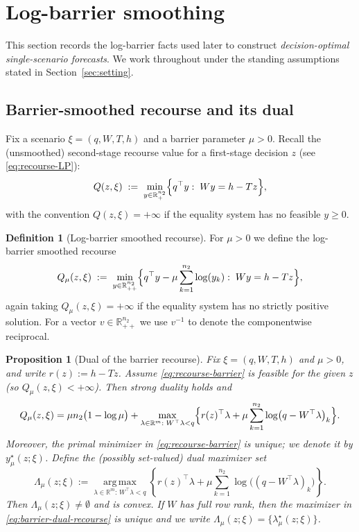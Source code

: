 \documentclass[11pt]{article}
\theoremstyle{plain}
\newtheorem{proposition}[theorem]{Proposition}
\theoremstyle{definition}
\newtheorem{definition}[theorem]{Definition}
\theoremstyle{remark}
\newcommand{\argmax}{\operatorname*{arg\,max}}
\begin{document}
\section{Log-barrier smoothing}\label{sec:barrier}

This section records the log-barrier facts used later to construct \emph{decision-optimal single-scenario
forecasts}. We work throughout under the standing assumptions stated in Section~\ref{sec:setting}.

\subsection{Barrier-smoothed recourse and its dual}\label{subsec:barrier:recourse}

Fix a scenario $\xi=(q,W,T,h)$ and a barrier parameter $\mu>0$. Recall the (unsmoothed) second-stage
recourse value for a first-stage decision $z$ (see \eqref{eq:recourse-LP}):
\[
Q(z,\xi)\;:=\;\min_{y\in\mathbb{R}^{n_2}_+}\Bigl\{q^\top y:\;Wy=h-Tz\Bigr\},
\]
with the convention $Q(z,\xi)=+\infty$ if the equality system has no feasible $y\ge 0$.

\begin{definition}[Log-barrier smoothed recourse]\label{def:Qmu}
For $\mu>0$ we define the log-barrier smoothed recourse
\begin{equation}\label{eq:recourse-barrier}
Q_\mu(z,\xi)\;:=\;\min_{y\in\mathbb{R}^{n_2}_{++}}\Bigl\{q^\top y-\mu\sum_{k=1}^{n_2}\log(y_k):\;Wy=h-Tz\Bigr\},
\end{equation}
again taking $Q_\mu(z,\xi)=+\infty$ if the equality system has no strictly positive solution.
For a vector $v\in\mathbb{R}^{n_2}_{++}$ we use $v^{-1}$ to denote the componentwise reciprocal.
\end{definition}

\begin{proposition}[Dual of the barrier recourse]\label{prop:barrier-dual}
Fix $\xi=(q,W,T,h)$ and $\mu>0$, and write $r(z):=h-Tz$. Assume \eqref{eq:recourse-barrier} is feasible
for the given $z$ (so $Q_\mu(z,\xi)<+\infty$). Then strong duality holds and
\begin{equation}\label{eq:barrier-dual-recourse}
Q_\mu(z,\xi)
=\mu n_2\bigl(1-\log\mu\bigr)
+\max_{\lambda\in\mathbb{R}^m:\;W^\top\lambda<q}
\Bigl\{r(z)^\top\lambda+\mu\sum_{k=1}^{n_2}\log\bigl(q-W^\top\lambda\bigr)_k\Bigr\}.
\end{equation}
Moreover, the primal minimizer in \eqref{eq:recourse-barrier} is unique; we denote it by
$y_\mu^\star(z;\xi)$. Define the (possibly set-valued) dual maximizer set
\[
\Lambda_\mu(z;\xi)
:= \argmax_{\lambda\in\mathbb{R}^m:\,W^\top\lambda<q}
\left\{ r(z)^\top\lambda + \mu\sum_{k=1}^{n_2}\log\bigl((q-W^\top\lambda)_k\bigr)\right\}.
\]
Then $\Lambda_\mu(z;\xi)\neq\emptyset$ and is convex. If $W$ has full row rank, then the maximizer
in \eqref{eq:barrier-dual-recourse} is unique and we write
$\Lambda_\mu(z;\xi)=\{\lambda_\mu^\star(z;\xi)\}$.
\end{proposition}
\end{document}
